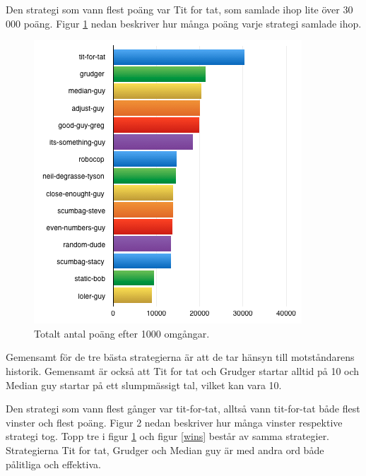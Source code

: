 Den strategi som vann flest poäng var Tit for tat, som samlade ihop lite över 30 000 poäng. Figur \ref{points} nedan beskriver hur många poäng varje strategi samlade ihop.

\begin{figure}[htb]
	\begin{center}
	\includegraphics[scale=0.75, angle=0]{bilder/points.png}
	\caption{Totalt antal poäng efter 1000 omgångar.}
	\label{points}
	\end{center}
\end{figure}

Gemensamt för de tre bästa strategierna är att de tar hänsyn till motståndarens historik. Gemensamt är också att Tit for tat och Grudger startar alltid på 10 och Median guy startar på ett slumpmässigt tal, vilket kan vara 10. 

\newpage

Den strategi som vann flest gånger var tit-for-tat, alltså vann tit-for-tat både flest vinster och flest poäng. Figur 2 nedan beskriver hur många vinster respektive strategi tog. Topp tre i figur \ref{points} och figur \ref{wins} består av samma strategier. Strategierna Tit for tat, Grudger och Median guy är med andra ord både pålitliga och effektiva. 

